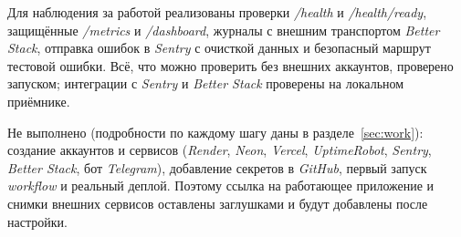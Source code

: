 \documentclass{stp}
\newcommand{\en}[1]{\textit{#1}}
\begin{document}
Для наблюдения за работой реализованы проверки \en{/health} и
\en{/health/ready}, защищённые \en{/metrics} и \en{/dashboard}, журналы с
внешним транспортом \en{Better Stack}, отправка ошибок в \en{Sentry} с
очисткой данных и безопасный маршрут тестовой ошибки. Всё, что можно проверить
без внешних аккаунтов, проверено запуском; интеграции с \en{Sentry} и
\en{Better Stack} проверены на локальном приёмнике.

Не выполнено (подробности по каждому шагу даны в разделе~\ref{sec:work}): создание аккаунтов и сервисов (\en{Render}, \en{Neon},
\en{Vercel}, \en{UptimeRobot}, \en{Sentry}, \en{Better Stack}, бот
\en{Telegram}), добавление секретов в \en{GitHub}, первый запуск
\en{workflow} и реальный деплой. Поэтому ссылка на работающее приложение и
снимки внешних сервисов оставлены заглушками и будут добавлены после
настройки.
\end{document}
